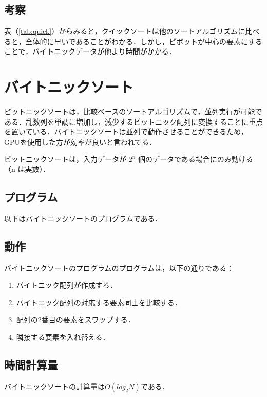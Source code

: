 \documentclass[a4j, titlepage]{jarticle}
\begin{document}
        
        \subsection{考察}
            表（\ref{tab:quick}）からみると，クイックソートは他のソートアルゴリズムに比べると，全体的に早いであることがわかる．しかし，ピボットが中心の要素にすることで，バイトニックデータが他より時間がかかる．

    \section{バイトニックソート}
        ビットニックソートは，比較ベースのソートアルゴリズムで，並列実行が可能である．乱数列を単調に増加し，減少するビットニック配列に変換することに重点を置いている．バイトニックソートは並列で動作させることができるため，GPUを使用した方が効率が良いと言われてる．

        ビットニックソートは，入力データが $2^n$ 個のデータである場合にのみ動ける（n は実数）．
        
        \subsection{プログラム}
            以下はバイトニックソートのプログラムである．
            

        \subsection{動作}
            バイトニックソートのプログラムのプログラムは，以下の通りである：
                \begin{screen}
                    \begin{enumerate}
                        \item バイトニック配列が作成すろ．
                        \item バイトニック配列の対応する要素同士を比較する．
                        \item 配列の2番目の要素をスワップする．
                        \item 隣接する要素を入れ替える．
                    \end{enumerate}
                \end{screen}
        
        \subsection{時間計算量}
            バイトニックソートの計算量は$O(log_2N)$である．
\end{document}
